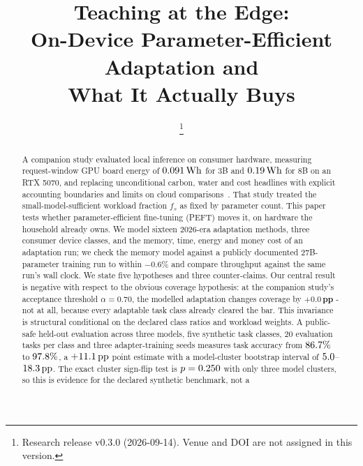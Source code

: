\documentclass[conference]{IEEEtran}
\newcommand{\Wh}{\,\text{Wh}}
\newcommand{\fs}{f_{s}}
\newcommand{\pp}{\,\text{pp}}
\begin{document}
\title{Teaching at the Edge:\\
On-Device Parameter-Efficient Adaptation and\\
What It Actually Buys}

\author{
\thanks{Research release v0.3.0 (2026-09-14). Venue and DOI are not assigned in this version.}}

\maketitle

\begin{abstract}
A companion study evaluated local inference on consumer hardware, measuring
request-window GPU board energy of $\RtxThreeEnergy\Wh$ for 3B and $\RtxEightEnergy\Wh$ for 8B on an
RTX 5070, and replacing unconditional carbon, water and cost headlines with
explicit accounting boundaries and limits on cloud comparisons~\cite{autoyou2026edge}.
That study treated the small-model-sufficient workload fraction $\fs$ as fixed by
parameter count. This paper tests whether parameter-efficient fine-tuning (PEFT)
moves it, on hardware the household already owns. We model sixteen 2026-era
adaptation methods, three consumer device classes, and the memory, time, energy
and money cost of an adaptation run; we check the memory model against a
publicly documented 27B-parameter training run to within $-0.6\%$ and compare throughput
against the same run's wall clock. We state five hypotheses and three counter-claims.
Our central result is negative with respect to the obvious coverage hypothesis:
at the companion study's acceptance threshold $\alpha = 0.70$, the modelled
adaptation changes coverage by $\mathbf{+0.0\pp}$ - not at all, because every
adaptable task class already cleared the bar. This invariance is structural
conditional on the declared class ratios and workload weights. A public-safe
held-out evaluation across three models, five synthetic task classes, 20
evaluation tasks per class and three adapter-training seeds measures task
accuracy from $86.7\%$ to $97.8\%$,
a $+\AdaptationUplift\pp$ point estimate with a model-cluster bootstrap
interval of $5.0$--$\AdaptationUpliftHigh\pp$. The exact
cluster sign-flip test is $p=0.250$ with only three model
clusters, so this is evidence for the declared synthetic benchmark, not a

\end{abstract}
\end{document}
